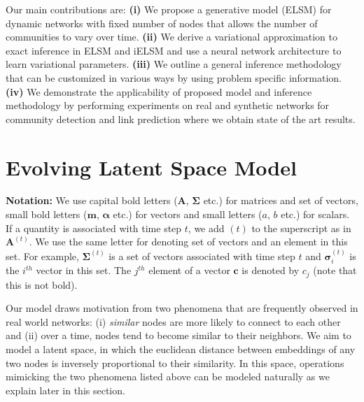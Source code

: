 \documentclass[letterpaper]{article} %
\begin{document}
Our main contributions are:
\textbf{(i)} We propose a generative model (ELSM) for dynamic networks with fixed number of nodes that allows the number of communities to vary over time.
\textbf{(ii)} We derive a variational approximation to exact inference in ELSM and iELSM and use a neural network architecture to learn variational parameters.
\textbf{(iii)} We outline a general inference methodology that can be customized in various ways by using problem specific information.
\textbf{(iv)} We demonstrate the applicability of proposed model and inference methodology by performing experiments on real and synthetic networks for community detection and link prediction where we obtain state of the art results.


\section{Evolving Latent Space Model}
\label{section:ELSM}
\textbf{Notation: }We use capital bold letters ($\mathbf{A}$, $\bm{\Sigma}$ etc.) for matrices and set of vectors, small bold letters ($\mathbf{m}$, $\bm{\alpha}$ etc.) for vectors and small letters ($a$, $b$ etc.) for scalars. If a quantity is associated with time step $t$, we add $(t)$ to the superscript as in $\mathbf{A}^{(t)}$. We use the same letter for denoting set of vectors and an element in this set. For example, $\bm{\Sigma}^{(t)}$ is a set of vectors associated with time step $t$ and $\bm{\sigma}_i^{(t)}$ is the $i^{th}$ vector in this set. The $j^{th}$ element of a vector $\mathbf{c}$ is denoted by $c_j$ (note that this is not bold).

Our model draws motivation from two phenomena that are frequently observed in real world networks: (i) \textit{similar} nodes are more likely to connect to each other and (ii) over a time, nodes tend to become similar to their neighbors. We aim to model a latent space, in which the euclidean distance between embeddings of any two nodes is inversely proportional to their similarity. In this space, operations mimicking the two phenomena listed above can be modeled naturally as we explain later in this section.
\end{document}
